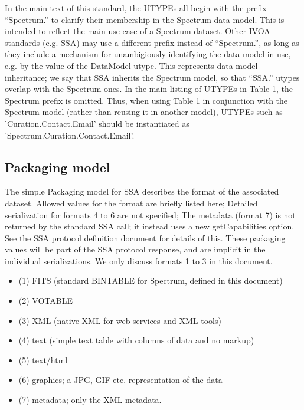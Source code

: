 \documentclass[11pt]{article}
\begin{document}
In the main text of this standard, the UTYPEs all begin with the prefix ``Spectrum.'' to
clarify their membership in the Spectrum data model. This
is intended to reflect the main use case of a Spectrum dataset. Other IVOA standards
(e.g. SSA) may use a different prefix instead of ``Spectrum.'', as long as they
include a mechanism for unambigiously identifying the data model in use,
e.g. by the value of the DataModel utype. This represents data model inheritance;
we say that SSA inherits the Spectrum model, so that ``SSA.'' utypes overlap
with the Spectrum ones. In the main listing of UTYPEs in Table 1, the Spectrum prefix is omitted.
Thus, when using Table 1 in conjunction with the Spectrum model (rather than reusing it in another
model), UTYPEs such as  'Curation.Contact.Email' should be instantiated as 'Spectrum.Curation.Contact.Email'.

\subsection{Packaging model}

The simple Packaging model for SSA 
describes the format of the associated dataset.
Allowed values for the format are briefly listed here;
Detailed serialization for
formats 4 to 6 are not specified;
The metadata (format 7)
is not returned by the standard SSA call; it instead uses a new getCapabilities option. 
See the SSA protocol definition document for details of this.
These packaging values will be part of the SSA protocol response,
and are implicit in the individual serializations. We only discuss formats 1 to 3
in this document.



\colorbox{ipink}{
\begin{minipage}{0.9\textwidth}
\begin{itemize}
\item (1) FITS (standard BINTABLE for Spectrum, defined in this document)
\item (2) VOTABLE  
\item (3) XML  (native XML for web services and XML tools)
\item (4) text  (simple text table with columns of data and no markup)
\item (5) text/html
\item (6) graphics; a JPG, GIF etc. representation of the data
\item (7) metadata; only the XML metadata.

\end{itemize}
\end{minipage}
}
\end{document}
